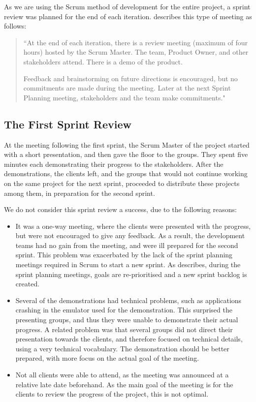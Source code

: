 As we are using the Scrum method of development for the entire \giraf project, a sprint review was planned for the end of each iteration. 
\citet[p. 71]{larmanAgile} describes this type of meeting as follows:
\begin{quote}
``At the end of each iteration, there is a review meeting (maximum of four hours)
hosted by the Scrum Master.
The team, Product Owner, and other stakeholders attend.
There is a demo of the product.

Feedback and brainstorming on future directions is encouraged, but no commitments are made during the meeting.
Later at the next Sprint Planning meeting, stakeholders and the team make commitments."
\end{quote}

\subsection{The First Sprint Review}
At the meeting following the first sprint, the Scrum Master of the \giraf project started with a short presentation, and then gave the floor to the groups.
They spent five minutes each demonstrating their progress to the stakeholders. 
After the demonstrations, the clients left, and the groups that would not continue working on the same project for the next sprint, proceeded to distribute these projects among them, in preparation for the second sprint.

We do not consider this sprint review a success, due to the following reasons:
\begin{itemize}
	\item It was a one-way meeting, where the clients were presented with the progress, but were not encouraged to give any feedback. 
	As a result, the development teams had no gain from the meeting, and were ill prepared for the second sprint. 
	This problem was exacerbated by the lack of the sprint planning meetings required in Scrum to start a new sprint.
	As \citet[p. 70]{larmanAgile} describes, during the sprint planning meetings, goals are re-prioritised and a new sprint backlog is created. 
	\item Several of the demonstrations had technical problems, such as applications crashing in the emulator used for the demonstration.
	This surprised the presenting groups, and thus they were unable to demonstrate their actual progress.
	A related problem was that several groups did not direct their presentation towards the clients, and therefore focused on technical details, using a very technical vocabulary.
	The demonstration should be better prepared, with more focus on the actual goal of the meeting.
	\item Not all clients were able to attend, as the meeting was announced at a relative late date beforehand.
	As the main goal of the meeting is for the clients to review the progress of the project, this is not optimal.
\end{itemize}

